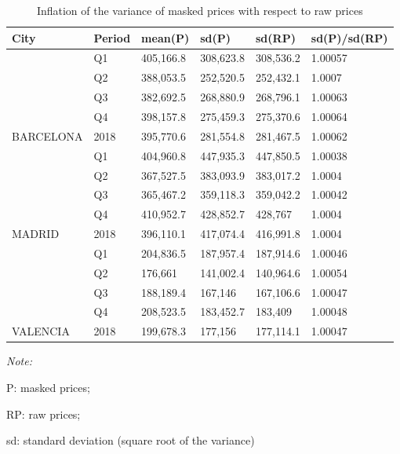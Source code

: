 \documentclass[Royal,times,sageh]{sagej}
\begin{document}
\begin{table}
\caption{\label{tab:variance-inflation-calculations}\label{tab:variance}Inflation of the variance of masked prices with respect to raw prices}
\centering
\fontsize{9}{11}\selectfont
\begin{threeparttable}
\begin{tabular}[t]{llllll}
\toprule
City & Period & mean(P) & sd(P) & sd(RP) & sd(P)/sd(RP)\\
\midrule
 & Q1 & 405,166.8 & 308,623.8 & 308,536.2 & 1.00057\\
\cmidrule{2-6}
 & Q2 & 388,053.5 & 252,520.5 & 252,432.1 & 1.0007\\
\cmidrule{2-6}
 & Q3 & 382,692.5 & 268,880.9 & 268,796.1 & 1.00063\\
\cmidrule{2-6}
 & Q4 & 398,157.8 & 275,459.3 & 275,370.6 & 1.00064\\
\cmidrule{2-6}
\multirow{-5}{*}{\raggedright\arraybackslash BARCELONA} & 2018 & 395,770.6 & 281,554.8 & 281,467.5 & 1.00062\\
\cmidrule{1-6}
 & Q1 & 404,960.8 & 447,935.3 & 447,850.5 & 1.00038\\
\cmidrule{2-6}
 & Q2 & 367,527.5 & 383,093.9 & 383,017.2 & 1.0004\\
\cmidrule{2-6}
 & Q3 & 365,467.2 & 359,118.3 & 359,042.2 & 1.00042\\
\cmidrule{2-6}
 & Q4 & 410,952.7 & 428,852.7 & 428,767 & 1.0004\\
\cmidrule{2-6}
\multirow{-5}{*}{\raggedright\arraybackslash MADRID} & 2018 & 396,110.1 & 417,074.4 & 416,991.8 & 1.0004\\
\cmidrule{1-6}
 & Q1 & 204,836.5 & 187,957.4 & 187,914.6 & 1.00046\\
\cmidrule{2-6}
 & Q2 & 176,661 & 141,002.4 & 140,964.6 & 1.00054\\
\cmidrule{2-6}
 & Q3 & 188,189.4 & 167,146 & 167,106.6 & 1.00047\\
\cmidrule{2-6}
 & Q4 & 208,523.5 & 183,452.7 & 183,409 & 1.00048\\
\cmidrule{2-6}
\multirow{-5}{*}{\raggedright\arraybackslash VALENCIA} & 2018 & 199,678.3 & 177,156 & 177,114.1 & 1.00047\\
\bottomrule
\end{tabular}
\begin{tablenotes}
\item \textit{Note: } 
\item P: masked prices; 
\item RP: raw prices; 
\item sd: standard deviation (square root of the variance)
\end{tablenotes}
\end{threeparttable}
\end{table}
\end{document}
